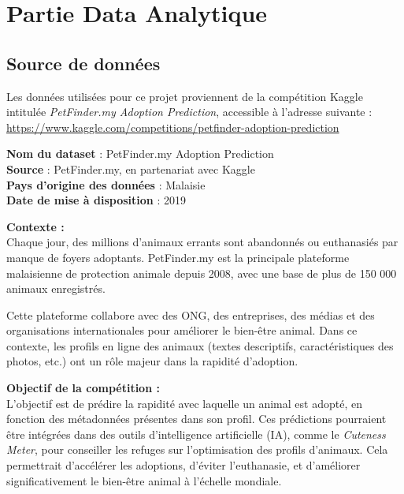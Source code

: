 \documentclass[a4paper,12pt]{article}
\begin{document}
\section{Partie Data Analytique}

\subsection {Source de données}

Les données utilisées pour ce projet proviennent de la compétition Kaggle intitulée \textit{PetFinder.my Adoption Prediction}, accessible à l'adresse suivante :\\[0.5em]
\url{https://www.kaggle.com/competitions/petfinder-adoption-prediction}

\bigskip

\textbf{Nom du dataset} : PetFinder.my Adoption Prediction \\
\textbf{Source} : PetFinder.my, en partenariat avec Kaggle \\
\textbf{Pays d’origine des données} : Malaisie \\
\textbf{Date de mise à disposition} : 2019

\medskip

\noindent
\textbf{Contexte :} \\
Chaque jour, des millions d’animaux errants sont abandonnés ou euthanasiés par manque de foyers adoptants. PetFinder.my est la principale plateforme malaisienne de protection animale depuis 2008, avec une base de plus de 150 000 animaux enregistrés.

Cette plateforme collabore avec des ONG, des entreprises, des médias et des organisations internationales pour améliorer le bien-être animal. Dans ce contexte, les profils en ligne des animaux (textes descriptifs, caractéristiques des photos, etc.) ont un rôle majeur dans la rapidité d’adoption.

\medskip

\noindent
\textbf{Objectif de la compétition :} \\
L’objectif est de prédire la rapidité avec laquelle un animal est adopté, en fonction des métadonnées présentes dans son profil. Ces prédictions pourraient être intégrées dans des outils d’intelligence artificielle (IA), comme le \textit{Cuteness Meter}, pour conseiller les refuges sur l’optimisation des profils d’animaux. Cela permettrait d’accélérer les adoptions, d’éviter l’euthanasie, et d’améliorer significativement le bien-être animal à l’échelle mondiale.
\end{document}
